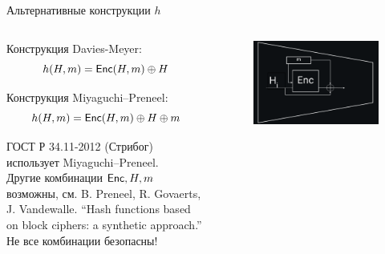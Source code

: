 \documentclass[usenames,dvipsnames,8pt,aspectratio=169]{beamer}
\begin{document}
\begin{frame}{Альтернативные конструкции $h$}
	\Large
	\begin{columns}[T]
		\begin{column}{0.5\textwidth}
	{\color{Orange} Конструкция Davies-Meyer:}
	\[
	h(H, m) = \textsf{Enc}(H, m)\oplus H
	\]
	
	 {\color{Orange} Конструкция Miyaguchi–Preneel:}
	 \[
	 h(H, m) = \textsf{Enc}(H, m)\oplus H \oplus m
	 \]
	 
	 \vspace{10pt}	
	 ГОСТ  Р 34.11-2012 (Стрибог) использует Miyaguchi–Preneel.\\[7pt]
	 Другие комбинации $\textsf{Enc}, H, m$ возможны, см. B. Preneel, R. Govaerts, J. Vandewalle. ``Hash functions based on block ciphers: a synthetic approach.''  \\[7pt]
	  Не все комбинации безопасны! \\[7pt]
	 
	 	\end{column}
	\begin{column}{0.5\textwidth}
		\begin{figure}
			\includegraphics[width=\textwidth]{MiyaguchiPreneelCompression}
			 
			\vspace{30pt}	
			
			
		\end{figure}
	\end{column}
\end{columns}
\end{frame}

%
%
%
%
%
%
\end{document}
